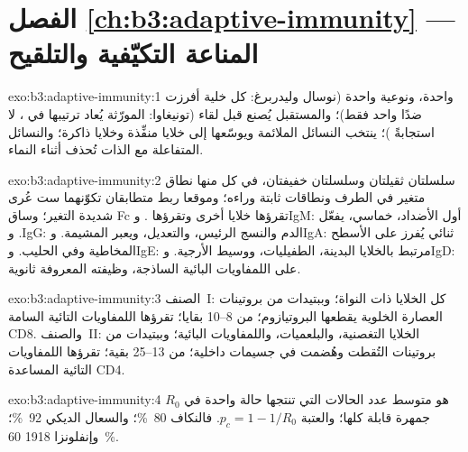 \section*{الفصل \ref{ch:b3:adaptive-immunity} --- المناعة التكيّفية والتلقيح}

\begin{solution}{exo:b3:adaptive-immunity:1}
 واحدة، ونوعية واحدة (نوسال وليدربرغ: كل خلية أفرزت
ضدًا  واحد فقط)؛ والمستقبل يُصنع قبل لقاء 
(تونيغاوا: المورّثة يُعاد ترتيبها في ، لا
استجابةً )؛  ينتخب النسائل الملائمة ويوسّعها
إلى خلايا منفِّذة وخلايا ذاكرة؛ والنسائل المتفاعلة مع الذات
تُحذف أثناء النماء.
\end{solution}

\begin{solution}{exo:b3:adaptive-immunity:2}
سلسلتان ثقيلتان وسلسلتان خفيفتان، في كل منها نطاق متغير في
الطرف ونطاقات ثابتة وراءه؛ وموقعا ربط متطابقان تكوّنهما ست
عُرى شديدة التغير؛ وساق Fc تقرؤها خلايا أخرى وتقرؤها
. وIgM: أول الأضداد، خماسي، يفعّل . وIgG:
 الدم والنسج الرئيس،  والتعديل، ويعبر المشيمة.
وIgA: ثنائي يُفرز على الأسطح المخاطية وفي الحليب. وIgE:
مرتبط بالخلايا البدينة،  الطفيليات، ووسيط الأرجية. وIgD:
على اللمفاويات البائية الساذجة، وظيفته المعروفة ثانوية.
\end{solution}

\begin{solution}{exo:b3:adaptive-immunity:3}
الصنف~I: كل الخلايا ذات النواة؛ وببتيدات من بروتينات
العصارة الخلوية يقطعها البروتيازوم؛ من 8--10 بقايا؛ تقرؤها
اللمفاويات التائية السامة CD8. والصنف~II: الخلايا التغصنية،
والبلعميات، واللمفاويات البائية؛ وببتيدات من بروتينات
التُقطت وهُضمت في جسيمات داخلية؛ من 13--25 بقية؛ تقرؤها
اللمفاويات التائية المساعدة CD4.
\end{solution}

\begin{solution}{exo:b3:adaptive-immunity:4}
$R_{0}$ هو متوسط عدد الحالات التي تنتجها حالة واحدة في
جمهرة قابلة كلها؛ والعتبة $p_{c} = 1 - 1/R_{0}$. فالنكاف
\qty{80}{\%}؛ والسعال الديكي \qty{92}{\%}؛ وإنفلونزا 1918 \qty{60}{\%}.
\end{solution}


